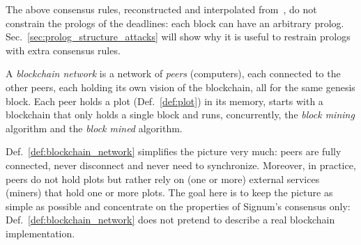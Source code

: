 %
The above consensus rules, reconstructed and interpolated
from~\cite{SignumPlotting,SignumSource},
do not constrain the prologs of the deadlines:
each block can have an arbitrary prolog. Sec.~\ref{sec:prolog_structure_attacks}
will show why it is useful to restrain prologs with extra consensus rules.
%
\begin{definition}\label{def:blockchain_network}
  A \emph{blockchain network} is a
  network of \emph{peers} (computers), each connected to the other peers,
  each holding its own vision of the blockchain, all for the same genesis block.
  Each peer holds a plot (Def.~\ref{def:plot}) in its memory, starts with
  a blockchain that only holds a single block and runs,
  concurrently, the \emph{block mining} algorithm
  and the \emph{block mined} algorithm.
\end{definition}
%
Def.~\ref{def:blockchain_network} simplifies the picture very much:
peers are fully connected, never disconnect and never need to synchronize.
Moreover, in practice, peers do not hold plots but rather rely on (one or more)
external services (miners) that hold one or more plots.
The goal here is to keep the picture as simple as possible and concentrate on the properties of
Signum's consensus only: Def.~\ref{def:blockchain_network} does not pretend
to describe a real blockchain implementation.

